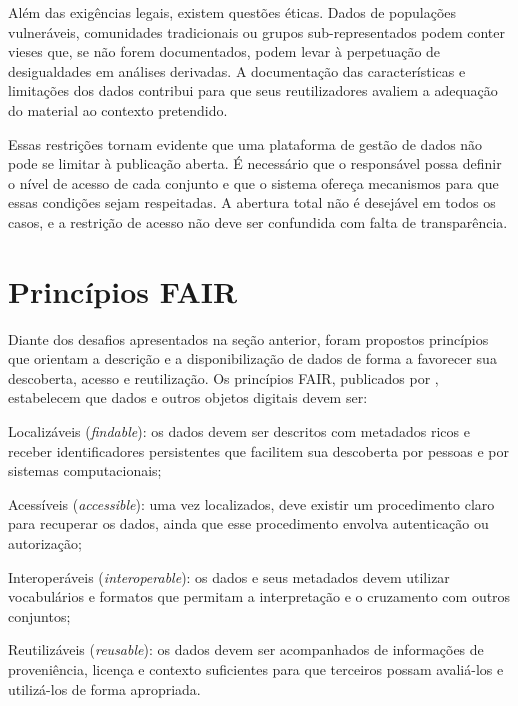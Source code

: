 Além das exigências legais, existem questões éticas. Dados de populações vulneráveis, comunidades tradicionais ou grupos sub-representados podem conter vieses que, se não forem documentados, podem levar à perpetuação de desigualdades em análises derivadas. A documentação das características e limitações dos dados contribui para que seus reutilizadores avaliem a adequação do material ao contexto pretendido.

Essas restrições tornam evidente que uma plataforma de gestão de dados não pode se limitar à publicação aberta. É necessário que o responsável possa definir o nível de acesso de cada conjunto e que o sistema ofereça mecanismos para que essas condições sejam respeitadas. A abertura total não é desejável em todos os casos, e a restrição de acesso não deve ser confundida com falta de transparência.

\section{Princípios FAIR}\label{sec:fair}

Diante dos desafios apresentados na seção anterior, foram propostos princípios que orientam a descrição e a disponibilização de dados de forma a favorecer sua descoberta, acesso e reutilização. Os princípios FAIR, publicados por , estabelecem que dados e outros objetos digitais devem ser:

\begin{compactitem}
    \item Localizáveis (\textit{findable}): os dados devem ser descritos com metadados ricos e receber identificadores persistentes que facilitem sua descoberta por pessoas e por sistemas computacionais;
    \item Acessíveis (\textit{accessible}): uma vez localizados, deve existir um procedimento claro para recuperar os dados, ainda que esse procedimento envolva autenticação ou autorização;
    \item Interoperáveis (\textit{interoperable}): os dados e seus metadados devem utilizar vocabulários e formatos que permitam a interpretação e o cruzamento com outros conjuntos;
    \item Reutilizáveis (\textit{reusable}): os dados devem ser acompanhados de informações de proveniência, licença e contexto suficientes para que terceiros possam avaliá-los e utilizá-los de forma apropriada.
\end{compactitem}


